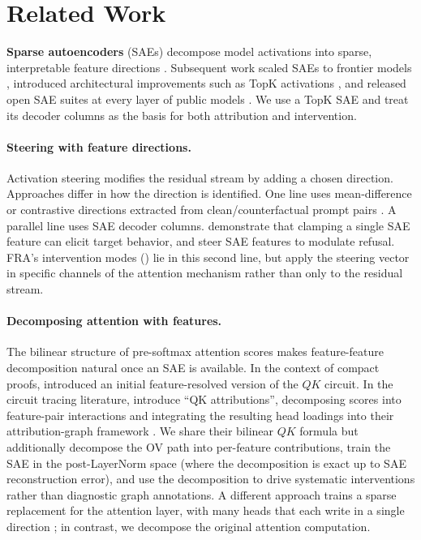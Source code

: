 \documentclass{article} %
\theoremstyle{plain}
\theoremstyle{definition}
\theoremstyle{remark}
\begin{document}
\section{Related Work}
\label{sec:related}

\textbf{Sparse autoencoders} (SAEs) decompose model activations into sparse, interpretable feature directions \citep{cunningham2023sparse,bricken2023monosemanticity}. Subsequent work scaled SAEs to frontier models \citep{templeton2024scaling}, introduced architectural improvements such as TopK activations \citep{gao2024scalingevaluatingsparseautoencoders}, and released open SAE suites at every layer of public models \citep{lieberum2024gemma}. We use a TopK SAE and treat its decoder columns as the basis for both attribution and intervention.

\paragraph{Steering with feature directions.} Activation steering modifies the residual stream by adding a chosen direction. Approaches differ in how the direction is identified. One line uses mean-difference or contrastive directions extracted from clean/counterfactual prompt pairs \citep{turner2023activation,panickssery2023steering}. A parallel line uses SAE decoder columns. \citet{templeton2024scaling} demonstrate that clamping a single SAE feature can elicit target behavior, and \citet{obrien2024steering} steer SAE features to modulate refusal. FRA's intervention modes () lie in this second line, but apply the steering vector in specific channels of the attention mechanism rather than only to the residual stream.

\paragraph{Decomposing attention with features.} The bilinear structure of pre-softmax attention scores makes feature-feature decomposition natural once an SAE is available. In the context of compact proofs, \citep{featints_compact_2025} introduced an initial feature-resolved version of the $QK$ circuit. In the circuit tracing literature, \citet{kamath2025tracing} introduce ``QK attributions'', decomposing scores into feature-pair interactions and integrating the resulting head loadings into their attribution-graph framework \citep{lindsey2025biology}. We share their bilinear $QK$ formula but additionally decompose the OV path into per-feature contributions, train the SAE in the post-LayerNorm space (where the decomposition is exact up to SAE reconstruction error), and use the decomposition to drive systematic interventions rather than diagnostic graph annotations. A different approach trains a sparse replacement for the attention layer, with many heads that each write in a single direction \citep{he2025lorsa}; in contrast, we decompose the original attention computation.
\end{document}
